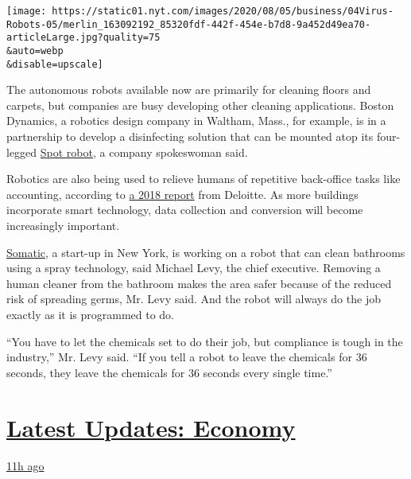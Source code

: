 \texttt{[image: https://static01.nyt.com/images/2020/08/05/business/04Virus-Robots-05/merlin\_163092192\_85320fdf-442f-454e-b7d8-9a452d49ea70-articleLarge.jpg?quality=75\\\&auto=webp\\\&disable=upscale]}

The autonomous robots available now are primarily for cleaning floors
and carpets, but companies are busy developing other cleaning
applications. Boston Dynamics, a robotics design company in Waltham,
Mass., for example, is in a partnership to develop a disinfecting
solution that can be mounted atop its four-legged
\href{https://www.bostondynamics.com/spot}{Spot robot}, a company
spokeswoman said.

Robotics are also being used to relieve humans of repetitive back-office
tasks like accounting, according to
\href{https://www2.deloitte.com/global/en/pages/real-estate/articles/robotics-real-estate-services.html}{a
2018 report} from Deloitte. As more buildings incorporate smart
technology, data collection and conversion will become increasingly
important.

\href{http://getsomatic.com/}{Somatic}, a start-up in New York, is
working on a robot that can clean bathrooms using a spray technology,
said Michael Levy, the chief executive. Removing a human cleaner from
the bathroom makes the area safer because of the reduced risk of
spreading germs, Mr. Levy said. And the robot will always do the job
exactly as it is programmed to do.

``You have to let the chemicals set to do their job, but compliance is
tough in the industry,'' Mr. Levy said. ``If you tell a robot to leave
the chemicals for 36 seconds, they leave the chemicals for 36 seconds
every single time.''

\hypertarget{latest-updates-economy}{%
\section{\texorpdfstring{\href{https://www.nytimes.com/live/2020/08/04/business/stock-market-today-coronavirus?action=click\&pgtype=Article\&state=default\&region=MAIN_CONTENT_1\&context=storylines_live_updates}{Latest
Updates:
Economy}}{Latest Updates: Economy}}\label{latest-updates-economy}}

\href{https://www.nytimes.com/live/2020/08/04/business/stock-market-today-coronavirus?action=click\&pgtype=Article\&state=default\&region=MAIN_CONTENT_1\&context=storylines_live_updates\#fox-corporations-plunging-profit-is-cushioned-by-fox-news}{11h
ago}

